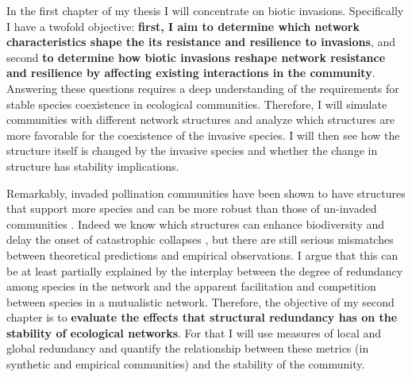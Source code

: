 \documentclass[a4paper]{article}
\begin{document}
In the first chapter of my thesis I will concentrate on biotic invasions.
Specifically I have a twofold objective: \textbf{first, I aim to determine which network characteristics shape the its resistance and resilience to invasions}, and second \textbf{to determine how biotic invasions reshape network resistance and resilience by affecting existing interactions in the community}.
Answering these questions requires a deep understanding of the requirements for stable species coexistence in ecological communities.
Therefore, I will simulate communities with different network structures and analyze which structures are more favorable for the coexistence of the invasive species.
I will then see how the structure itself is changed by the invasive species and whether the change in structure has stability implications.

Remarkably, invaded pollination communities have been shown to have structures that support more species \autocite{Stouffer2014} and can be more robust than those of un-invaded communities \autocite{Albrecht2014}.
Indeed we know which structures can enhance biodiversity \autocite{Bastolla2009} and delay the onset of catastrophic collapses \autocite{Lever2014}, but there are still serious mismatches between theoretical predictions and empirical observations.
I argue that this can be at least partially explained by the interplay between the degree of redundancy among species in the network and the apparent facilitation and competition between species in a mutualistic network.
Therefore, the objective of my second chapter is to \textbf{evaluate the effects that structural redundancy has on the stability of ecological networks}.
For that I will use measures of local and global redundancy and quantify the relationship between these metrics (in synthetic and empirical communities) and the stability of the community.
\end{document}
